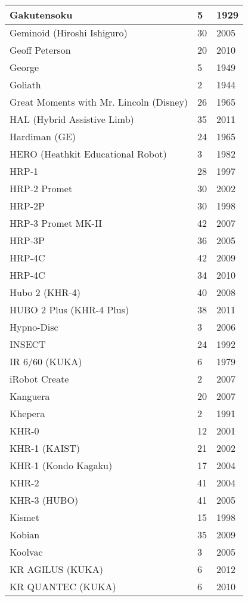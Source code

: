 \begin{longtable}{l | l | l }
Gakutensoku	&	5	&	1929	\\	\hline
Geminoid (Hiroshi Ishiguro)	&	30	&	2005	\\	\hline
Geoff Peterson	&	20	&	2010	\\	\hline
George	&	5	&	1949	\\	\hline
Goliath	&	2	&	1944	\\	\hline
Great Moments with Mr. Lincoln (Disney)	&	26	&	1965	\\	\hline
HAL (Hybrid Assistive Limb)	&	35	&	2011	\\	\hline
Hardiman (GE)	&	24	&	1965	\\	\hline
HERO (Heathkit Educational Robot)	&	3	&	1982	\\	\hline
HRP-1	&	28	&	1997	\\	\hline
HRP-2 Promet	&	30	&	2002	\\	\hline
HRP-2P	&	30	&	1998	\\	\hline
HRP-3 Promet MK-II	&	42	&	2007	\\	\hline
HRP-3P	&	36	&	2005	\\	\hline
HRP-4C	&	42	&	2009	\\	\hline
HRP-4C	&	34	&	2010	\\	\hline
Hubo 2 (KHR-4)	&	40	&	2008	\\	\hline
HUBO 2 Plus (KHR-4 Plus)	&	38	&	2011	\\	\hline
Hypno-Disc	&	3	&	2006	\\	\hline
INSECT	&	24	&	1992	\\	\hline
IR 6/60  (KUKA)	&	6	&	1979	\\	\hline
iRobot Create	&	2	&	2007	\\	\hline
Kanguera	&	20	&	2007	\\	\hline
Khepera	&	2	&	1991	\\	\hline
KHR-0 	&	12	&	2001	\\	\hline
KHR-1 (KAIST)	&	21	&	2002	\\	\hline
KHR-1 (Kondo Kagaku)	&	17	&	2004	\\	\hline
KHR-2	&	41	&	2004	\\	\hline
KHR-3 (HUBO)	&	41	&	2005	\\	\hline
Kismet \cite{robotKismetScassellati98eyefinding}	&	15	&	1998	\\	\hline
Kobian	&	35	&	2009	\\	\hline
Koolvac	&	3	&	2005	\\	\hline
KR AGILUS (KUKA)	&	6	&	2012	\\	\hline
KR QUANTEC (KUKA)	&	6	&	2010	\\	\hline

\end{longtable}
